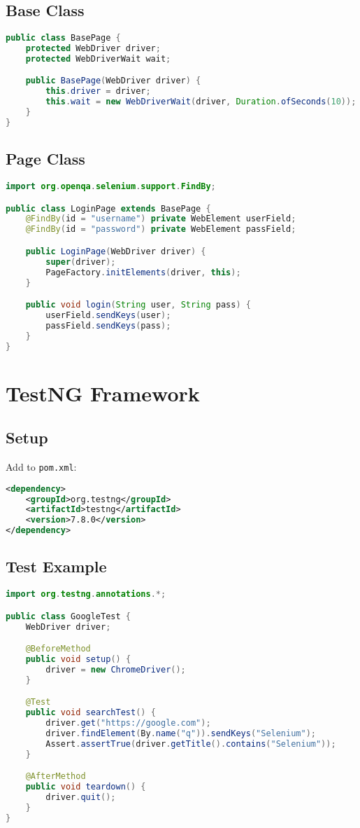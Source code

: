 \documentclass[a4paper,12pt]{article}
\begin{document}
\subsection{Base Class}
\begin{lstlisting}[language=Java]
public class BasePage {
    protected WebDriver driver;
    protected WebDriverWait wait;

    public BasePage(WebDriver driver) {
        this.driver = driver;
        this.wait = new WebDriverWait(driver, Duration.ofSeconds(10));
    }
}
\end{lstlisting}

\subsection{Page Class}
\begin{lstlisting}[language=Java]
import org.openqa.selenium.support.FindBy;

public class LoginPage extends BasePage {
    @FindBy(id = "username") private WebElement userField;
    @FindBy(id = "password") private WebElement passField;

    public LoginPage(WebDriver driver) {
        super(driver);
        PageFactory.initElements(driver, this);
    }

    public void login(String user, String pass) {
        userField.sendKeys(user);
        passField.sendKeys(pass);
    }
}
\end{lstlisting}

\section{TestNG Framework}

\subsection{Setup}
Add to \texttt{pom.xml}:
\begin{lstlisting}[language=XML]
<dependency>
    <groupId>org.testng</groupId>
    <artifactId>testng</artifactId>
    <version>7.8.0</version>
</dependency>
\end{lstlisting}

\subsection{Test Example}
\begin{lstlisting}[language=Java]
import org.testng.annotations.*;

public class GoogleTest {
    WebDriver driver;

    @BeforeMethod
    public void setup() {
        driver = new ChromeDriver();
    }

    @Test
    public void searchTest() {
        driver.get("https://google.com");
        driver.findElement(By.name("q")).sendKeys("Selenium");
        Assert.assertTrue(driver.getTitle().contains("Selenium"));
    }

    @AfterMethod
    public void teardown() {
        driver.quit();
    }
}
\end{lstlisting}
\end{document}
